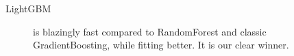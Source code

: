 \documentclass{tikzposter} %
\begin{document}
\begin{columns}
{%
}


{
\begin{description}
  	\item[LightGBM]  is blazingly fast compared to RandomForest and classic GradientBoosting, while fitting better. It is our clear winner.\\
  	

\end{description}}
\end{columns}
\end{document}
